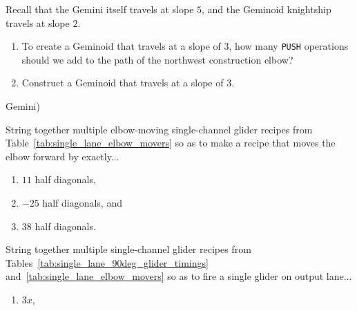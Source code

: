 \begin{multicols}{2}
	
	\mfilbreak
	
	
	\begin{problem}\label{exer:gemini_slope_3}
		Recall that the Gemini itself travels at slope $5$, and the Geminoid knightship travels at slope $2$.\smallskip
		
		\begin{enumerate}[label=\bf\color{ocre}(\alph*)]
			\item {} To create a Geminoid that travels at a slope of $3$, how many \texttt{PUSH} operations should we add to the path of the northwest construction elbow?
			
			\item {} Construct a Geminoid that travels at a slope of $3$.
		\end{enumerate} Gemini)
	\end{problem}
	
	
	\mfilbreak
	
	
	\begin{problem}\label{exer:move_single_channel_elbow} 
		String together multiple elbow-moving single-channel glider recipes from Table~\ref{tab:single_lane_elbow_movers} so as to make a recipe that moves the elbow forward by exactly...\smallskip
		
		\begin{enumerate}[label=\bf\color{ocre}(\alph*)]
			\item $11$ half diagonals,
			
			\item $-25$ half diagonals, and
			
			\item $38$ half diagonals.
		\end{enumerate}
	\end{problem}
	
	
	\mfilbreak
	
	
	\begin{problem}\label{exer:single_channel_90_degree_fire} 
		String together multiple single-channel glider recipes from Tables~\ref{tab:single_lane_90deg_glider_timings} and~\ref{tab:single_lane_elbow_movers} so as to fire a single glider on output lane...\smallskip
		
		\begin{enumerate}[label=\bf\color{ocre}(\alph*)]
			\item $3x$,
			

\end{enumerate}
\end{problem}
\end{multicols}
